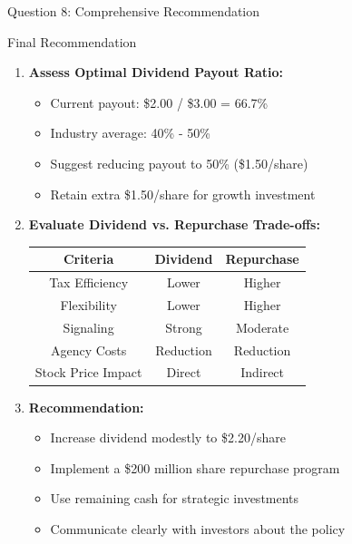\documentclass[aspectratio=169]{beamer}
\begin{document}
	\begin{frame}{Question 8: Comprehensive Recommendation}
		\begin{block}{Final Recommendation}
			
			\begin{enumerate}
				\item \textbf{Assess Optimal Dividend Payout Ratio:}
				\begin{itemize}
					\item Current payout: \$2.00 / \$3.00 = 66.7\%
					\item Industry average: 40\% - 50\%
					\item Suggest reducing payout to 50\% (\$1.50/share)
					\item Retain extra \$1.50/share for growth investment
				\end{itemize}
				
				\item \textbf{Evaluate Dividend vs. Repurchase Trade-offs:}
				\begin{table}[h]
					\centering
					\begin{tabular}{|c|c|c|}
						\hline
						\textbf{Criteria} & \textbf{Dividend} & \textbf{Repurchase} \\
						\hline
						Tax Efficiency & Lower & Higher \\
						Flexibility & Lower & Higher \\
						Signaling & Strong & Moderate \\
						Agency Costs & Reduction & Reduction \\
						Stock Price Impact & Direct & Indirect \\
						\hline
					\end{tabular}
				\end{table}
				
				\item \textbf{Recommendation:}
				\begin{itemize}
					\item Increase dividend modestly to \$2.20/share
					\item Implement a \$200 million share repurchase program
					\item Use remaining cash for strategic investments
					\item Communicate clearly with investors about the policy
				\end{itemize}
			\end{enumerate}
		\end{block}
	\end{frame}
	
\end{document}
